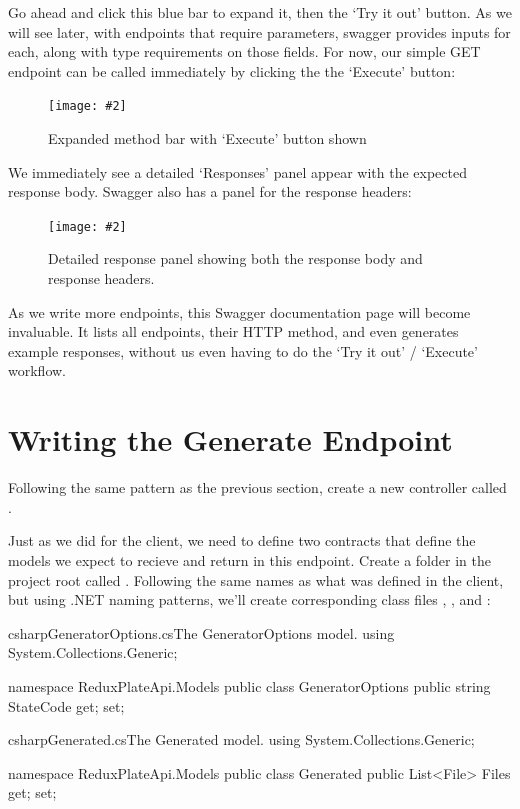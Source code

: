\documentclass[paper=6in:9in,pagesize=pdftex,headinclude=on,footinclude=on,12pt,twoside]{scrbook}
\newcommand{\standardfigure}[3]{\begin{figure}[H]\begin{center}\texttt{[image: \#2]}\caption{#3}\label{fig:#2}\end{center}\end{figure}}
\begin{document}
Go ahead and click this blue bar to expand it, then the `Try it out' button. As we will see later, with endpoints that require parameters, swagger provides inputs for each, along with type requirements on those fields. For now, our simple GET endpoint can be called immediately by clicking the the `Execute' button:

\standardfigure{\textwidth}{backend/swagger-expanded}{Expanded method bar with `Execute' button shown}

We immediately see a detailed `Responses' panel appear with the expected response body. Swagger also has a panel for the response headers:

\standardfigure{\textwidth}{backend/swagger-response-panel}{Detailed response panel showing both the response body and response headers.}

As we write more endpoints, this Swagger documentation page will become invaluable. It lists all endpoints, their HTTP method, and even generates example responses, without us even having to do the `Try it out' / `Execute' workflow.

\section{Writing the Generate Endpoint}

Following the same pattern as the previous section, create a new controller called .

Just as we did for the client, we need to define two contracts that define the models we expect to recieve and return in this endpoint. Create a folder in the project root called . Following the same names as what was defined in the client, but using .NET naming patterns, we'll create corresponding class files , , and :

\begin{codeInput}{csharp}{GeneratorOptions.cs}{The GeneratorOptions model.}
using System.Collections.Generic;

namespace ReduxPlateApi.Models
{
    public class GeneratorOptions
    {
        public string StateCode { get; set; }
    }
}  
\end{codeInput}

\begin{codeInput}{csharp}{Generated.cs}{The Generated model.}
using System.Collections.Generic;

namespace ReduxPlateApi.Models
{
    public class Generated
    {
        public List<File> Files { get; set; }
    }
}  
\end{codeInput}
\end{document}
